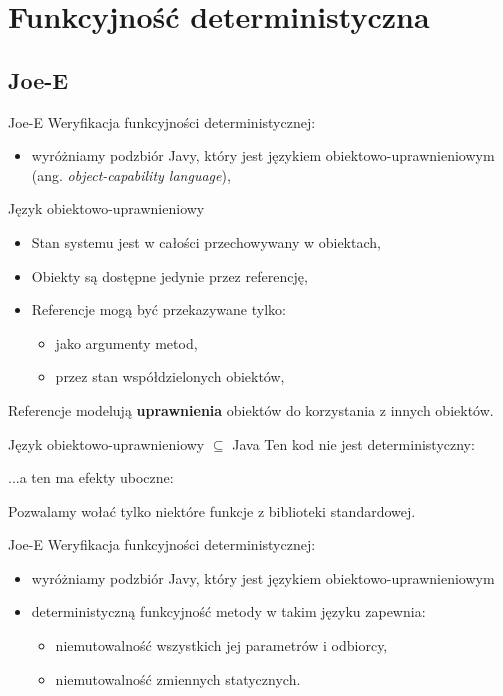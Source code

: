 \documentclass{beamer}
\begin{document}
\section{Funkcyjność deterministyczna}

\subsection{Joe-E}

\begin{frame}{Joe-E}
  Weryfikacja funkcyjności deterministycznej:
  \begin{itemize}
    \item wyróżniamy podzbiór Javy, który jest językiem
      obiektowo-uprawnieniowym (ang. \emph{object-capability language}), 
  \end{itemize}
\end{frame}

\begin{frame}{Język obiektowo-uprawnieniowy}
  \begin{itemize}
  \item<1-> Stan systemu jest w całości przechowywany w obiektach, 
  \item<2-> Obiekty są dostępne jedynie przez referencję, 
  \item<3-> Referencje mogą być przekazywane tylko:
    \begin{itemize}
      \item jako argumenty metod, 
      \item przez stan współdzielonych obiektów, 
    \end{itemize}
  \end{itemize}
  \pause
  Referencje modelują {\bf uprawnienia} obiektów do korzystania z
  innych obiektów.
\end{frame}

\begin{frame}{Język obiektowo-uprawnieniowy $\subseteq$ Java}
  Ten kod nie jest deterministyczny:
  
  \pause
  ...a ten ma efekty uboczne:
  
  \pause
  Pozwalamy wołać tylko niektóre funkcje z biblioteki standardowej.
\end{frame}

\begin{frame}{Joe-E}
  Weryfikacja funkcyjności deterministycznej:
  \begin{itemize}
    \item wyróżniamy podzbiór Javy, który jest językiem
      obiektowo-uprawnieniowym
    \item deterministyczną funkcyjność metody w takim języku 
      zapewnia:
      \begin{itemize}
      \item niemutowalność wszystkich jej parametrów i odbiorcy, 
      \item niemutowalność zmiennych statycznych.
      \end{itemize}
  \end{itemize}
\end{frame}
\end{document}
